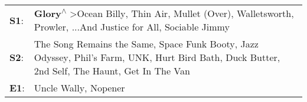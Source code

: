 \begin{supertabular}{p{0.03\textwidth}p{0.92\textwidth}}
 \textbf{S1}:  &                                                              \textbf{Glory\textsuperscript{$\wedge$}} \textgreater \enspace Ocean Billy\textsuperscript{}, \enspace Thin Air\textsuperscript{}, \enspace Mullet (Over)\textsuperscript{}, \enspace Walletsworth\textsuperscript{}, \enspace Prowler\textsuperscript{}, \enspace ...And Justice for All\textsuperscript{}, \enspace Sociable Jimmy\textsuperscript{}  \enspace  \\
 \textbf{S2}:  &  The Song Remains the Same\textsuperscript{}, \enspace Space Funk Booty\textsuperscript{}, \enspace Jazz Odyssey\textsuperscript{}, \enspace Phil's Farm\textsuperscript{}, \enspace UNK\textsuperscript{}, \enspace Hurt Bird Bath\textsuperscript{}, \enspace Duck Butter\textsuperscript{}, \enspace 2nd Self\textsuperscript{}, \enspace The Haunt\textsuperscript{}, \enspace Get In The Van\textsuperscript{}  \enspace  \\
 \textbf{E1}:  &                                                                                                                                                                                                                                                                                                                                                   Uncle Wally\textsuperscript{}, \enspace Nopener\textsuperscript{}  \enspace  \\
\end{supertabular}
